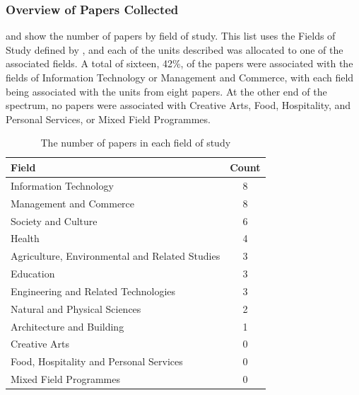 \clearpage
\subsubsection{Overview of Papers Collected} %
\label{sub:overview_of_papers_collected}

 and  show the number of papers by field of study. This list uses the Fields of Study defined by \citet{Trewin:2000}, and each of the units described was allocated to one of the associated fields. A total of sixteen, 42\%, of the papers were associated with the fields of Information Technology or Management and Commerce, with each field being associated with the units from eight papers. At the other end of the spectrum, no papers were associated with Creative Arts, Food, Hospitality, and Personal Services, or Mixed Field Programmes.

\begin{table}[p]
	\centering
	\caption{The number of papers in each field of study}
	\label{tbl:degrees}
	\footnotesize
    \begin{tabular}{lc}
    \textbf{Field} & \textbf{Count} \\ \hline
    Information Technology & 8 \\
	Management and Commerce &	8 \\
	Society and Culture &	6 \\
	Health &	4 \\
	Agriculture, Environmental and Related Studies &	3 \\
	Education &	3 \\
	Engineering and Related Technologies &	3 \\
	Natural and Physical Sciences &	2 \\
	Architecture and Building &	1 \\
	Creative Arts &	0 \\
	Food, Hospitality and Personal Services &	0 \\
	Mixed Field Programmes &	0 \\
    \end{tabular}
\end{table}

